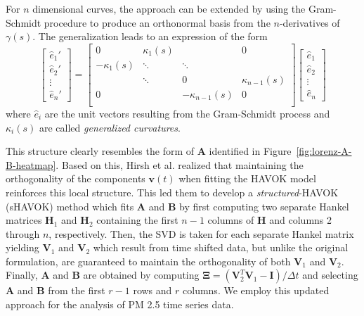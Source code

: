 For $n$ dimensional curves, the approach can be extended by using the
Gram-Schmidt procedure to produce an orthonormal basis from the $n$-derivatives
of $\gamma(s)$. The generalization leads to an expression of the form
\begin{equation}
    \begin{bmatrix} \hat{e}_1' \\ \hat{e}_2' \\ \vdots \\ \hat{e}_n' \end{bmatrix} = \begin{bmatrix}
    0 & \kappa_1(s) &  & 0 \\
    -\kappa_1(s) & \ddots & \ddots & \\
     & \ddots & 0 & \kappa_{n-1}(s) \\
     0 &  & -\kappa_{n-1}(s) & 0 \\
    \end{bmatrix} \begin{bmatrix} \hat{e}_1 \\ \hat{e}_2 \\ \vdots \\ \hat{e}_n \end{bmatrix}
\end{equation}
where $\hat{e}_i$ are the unit vectors resulting from the Gram-Schmidt process
and $\kappa_i(s)$ are called \textit{generalized curvatures}.

This structure clearly resembles the form of $\mathbf{A}$ identified in
Figure~\ref{fig:lorenz-A-B-heatmap}. Based on this, Hirsh et al. realized that
maintaining the orthogonality of the components $\mathbf{v}(t)$ when fitting the
HAVOK model reinforces this local structure. This led them to develop a
\textit{structured}-HAVOK (sHAVOK) method which fits $\mathbf{A}$ and
$\mathbf{B}$ by first computing two separate Hankel matrices $\mathbf{H}_1$ and
$\mathbf{H}_2$ containing the first $n-1$ columns of $\mathbf{H}$ and
columns 2 through $n$, respectively. Then, the SVD is taken for each separate
Hankel matrix yielding $\mathbf{V}_1$ and $\mathbf{V}_2$ which result from time
shifted data, but unlike the original formulation, are guaranteed to maintain
the orthogonality of both $\mathbf{V}_1$ and $\mathbf{V}_2$. Finally,
$\mathbf{A}$ and $\mathbf{B}$ are obtained by computing $\mathbf{\Xi} =
(\mathbf{V}_2^T\mathbf{V}_1 - \mathbf{I})/\Delta t$ and selecting $\mathbf{A}$
and $\mathbf{B}$ from the first $r-1$ rows and $r$ columns. We employ this
updated approach for the analysis of PM 2.5 time series data.

